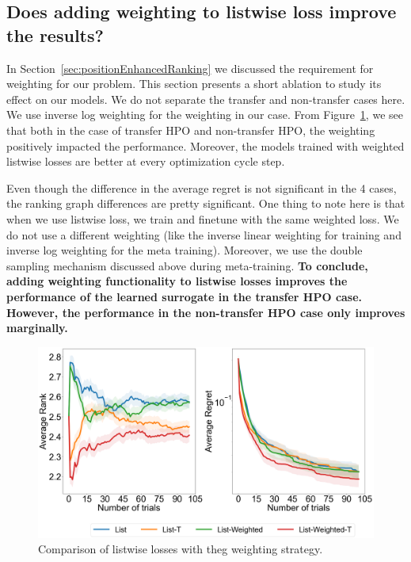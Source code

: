 \documentclass[12pt, twoside, ngerman]{report}
\begin{document}
\subsection{Does adding weighting to listwise loss improve the results?}

In Section~\ref{sec:positionEnhancedRanking} we discussed the requirement for weighting for our problem.
This section presents a short ablation to study its effect on our models.
We do not separate the transfer and non-transfer cases here.
We use inverse log weighting for the weighting in our case.
From Figure~\ref{fig:Q2Ablation}, we see that both in the case of transfer HPO and non-transfer HPO, the weighting positively impacted the performance. Moreover, the models trained with weighted listwise losses are better at every optimization cycle step.

Even though the difference in the average regret is not significant in the 4 cases,  the ranking graph differences are pretty significant. One thing to note here is that when we use listwise loss,  we train and finetune with the same weighted loss. We do not use a different weighting (like the inverse linear weighting for training and inverse log weighting for the meta training). Moreover, we use the double sampling mechanism discussed above during meta-training.
\textbf{To conclude,  adding weighting functionality to listwise losses improves the performance of the learned surrogate in the transfer HPO case.
However,  the performance in the non-transfer HPO case only improves marginally.}


\begin{figure}[h]
  \centering
    \includegraphics[scale=0.25]{images/Q2Ablation}
    \caption{Comparison of listwise losses with theg weighting strategy.}
    \label{fig:Q2Ablation}
\end{figure}
\end{document}
